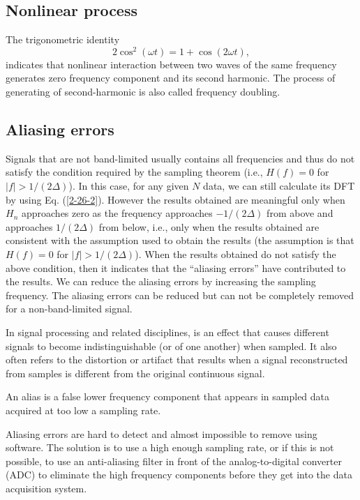 \documentclass{article}
\newcommand{\tmtextbf}[1]{\text{{\bfseries{#1}}}}
\newcommand{\tmtextit}[1]{\text{{\itshape{#1}}}}
\begin{document}
\subsection{Nonlinear process}

The trigonometric identity
\begin{equation}
  2 \cos^2 (\omega t) = 1 + \cos (2 \omega t),
\end{equation}
indicates that nonlinear interaction between two waves of the same frequency
generates zero frequency component and its second harmonic. The process of
generating of second-harmonic is also called frequency doubling.

\subsection{Aliasing errors}

Signals that are not band-limited usually contains all frequencies and thus do
not satisfy the condition required by the sampling theorem (i.e., $H (f) = 0$
for $|f| > 1 / (2 \Delta)$). In this case, for any given $N$ data, we can
still calculate its DFT by using Eq. (\ref{2-26-2}). However the results
obtained are meaningful only when $H_n$ approaches zero as the frequency
approaches $- 1 / (2 \Delta)$ from above and approaches $1 / (2 \Delta)$ from
below, i.e., only when the results obtained are consistent with the assumption
used to obtain the results (the assumption is that $H (f) = 0$ for $|f| > 1 /
(2 \Delta)$). When the results obtained do not satisfy the above condition,
then it indicates that the ``aliasing errors'' have contributed to the
results. We can reduce the aliasing errors by increasing the sampling
frequency. The aliasing errors can be reduced but can not be completely
removed for a non-band-limited signal.

In signal processing and related disciplines, \tmtextbf{aliasing} is an effect
that causes different signals to become indistinguishable (or
\tmtextit{aliases} of one another) when sampled. It also often refers to the
distortion or artifact that results when a signal reconstructed from samples
is different from the original continuous signal.

An alias is a false lower frequency component that appears in sampled data
acquired at too low a sampling rate.

Aliasing errors are hard to detect and almost impossible to remove using
software. The solution is to use a high enough sampling rate, or if this is
not possible, to use an anti-aliasing filter in front of the analog-to-digital
converter (ADC) to eliminate the high frequency components before they get
into the data acquisition system.
\end{document}
